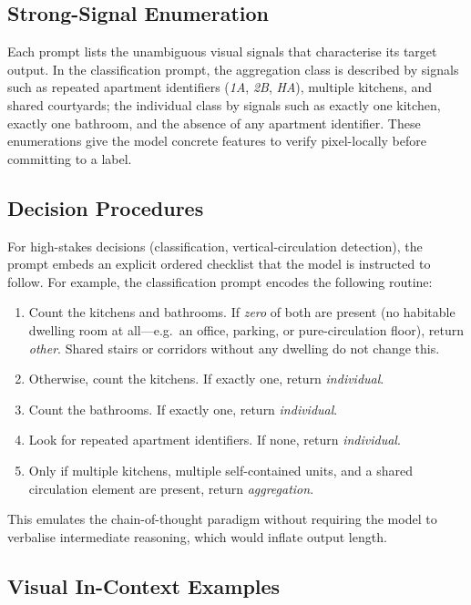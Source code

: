 \documentclass[12pt,a4paper,openright]{report}
\begin{document}
\subsection{Strong-Signal Enumeration}

Each prompt lists the unambiguous visual signals that characterise its target output. In the classification prompt, the aggregation class is described by signals such as repeated apartment identifiers (\textit{1A}, \textit{2B}, \textit{HA}), multiple kitchens, and shared courtyards; the individual class by signals such as exactly one kitchen, exactly one bathroom, and the absence of any apartment identifier. These enumerations give the model concrete features to verify pixel-locally before committing to a label.

\subsection{Decision Procedures}

For high-stakes decisions (classification, vertical-circulation detection), the prompt embeds an explicit ordered checklist that the model is instructed to follow. For example, the classification prompt encodes the following routine:

\begin{enumerate}
    \item Count the kitchens and bathrooms. If \emph{zero} of both are present (no habitable dwelling room at all---e.g.\ an office, parking, or pure-circulation floor), return \textit{other}. Shared stairs or corridors without any dwelling do not change this.
    \item Otherwise, count the kitchens. If exactly one, return \textit{individual}.
    \item Count the bathrooms. If exactly one, return \textit{individual}.
    \item Look for repeated apartment identifiers. If none, return \textit{individual}.
    \item Only if multiple kitchens, multiple self-contained units, and a shared circulation element are present, return \textit{aggregation}.
\end{enumerate}

This emulates the chain-of-thought paradigm without requiring the model to verbalise intermediate reasoning, which would inflate output length.

\subsection{Visual In-Context Examples}
\label{sec:visual-icl}
\end{document}
